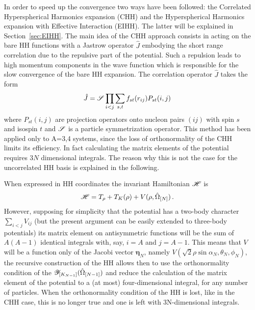 In order to speed up the convergence two ways have been followed: the Correlated Hyperspherical Harmonics expansion (CHH)  and the 
Hyperspherical Harmonics expansion with Effective Interaction (EIHH). The latter will be explained in Section~\ref{sec:EIHH}. 
The main idea of the CHH approach consists in acting on the bare HH functions with a Jastrow
operator $\hat J$ embodying the short range correlation due to the repulsive part of the potential.
Such a repulsion leads to high momentum components in the wave function which is responsible for the 
slow convergence of the bare HH expansion. The correlation operator $\hat J$ takes the form
\begin{equation}
 \hat J={\cal S}\prod_{i<j}\sum_{s,t}f_{st}(r_{ij})P_{st}(i,j)
\end{equation}
where $P_{st}(i,j)$  are projection operators onto nucleon pairs $(ij)$ with spin $s$ and isospin $t$ and
${\cal S}$ is a particle symmetrization operator. This method has been applied only to A=3,4 systems, since the loss of orthonormality
of the CHH limits its efficiency. In fact calculating the matrix elements of the potential requires $3N$ dimensional integrals.
The reason why  this is not the case for the uncorrelated HH basis is explained in the following.

When expressed in HH coordinates the invariant Hamiltonian $\cal H$ is
\begin{equation}
 {\cal H}=   T_\rho + T_K(\rho) + V(\rho, \hat\Omega_{[N]})\,.
\end{equation}
However, supposing for simplicity that the potential has a two-body character $\sum_{i<j} V_{ij}$
(but the present argument can be easily extended to three-body potentials) its matrix element 
on antisymmetric functions will be the sum of $A(A-1)$ identical integrals 
with, say, $i=A$ and $j=A-1$. This means that $V$  will be a function only of the Jacobi vector $\mathbf{\eta}_N$, namely
$V(\sqrt{2}\rho \sin \alpha_N, \theta_N,\phi_N)$, 
the recursive  construction of the HH allows then to use the orthonormality condition 
of the ${\cal Y}_{[K_{N-1}]}(\hat\Omega_{[N-1]})$ and reduce the calculation of the matrix element of the potential 
to a (at most) four-dimensional integral, for any number of particles. When the orthonormality condition of the HH is lost, like in the 
CHH case, this is no longer true and one is left with 3N-dimensional integrals.


